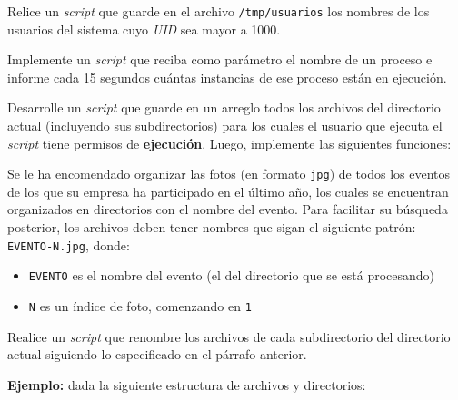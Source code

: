 \begin{questions}

\question Relice un \textit{script} que guarde en el archivo \texttt{/tmp/usuarios} los
  nombres de los usuarios del sistema cuyo \textit{UID} sea mayor a 1000.

\question Implemente un \textit{script} que reciba como parámetro el nombre de un
  proceso e informe cada 15 segundos cuántas instancias de ese proceso están en
  ejecución.

\question Desarrolle un \textit{script} que guarde en un arreglo todos los archivos del
  directorio actual (incluyendo sus subdirectorios) para los cuales el usuario que ejecuta
  el \textit{script} tiene permisos de \textbf{ejecución}. Luego, implemente las siguientes
  funciones:

\question Se le ha encomendado organizar las fotos (en formato \texttt{jpg}) de todos los eventos
  de los que su empresa ha participado en el último año, los cuales se encuentran organizados en
  directorios con el nombre del evento. Para facilitar su búsqueda posterior, los archivos deben
  tener nombres que sigan el siguiente patrón: \texttt{EVENTO-N.jpg}, donde:
  \begin{itemize}
    \item \texttt{EVENTO} es el nombre del evento (el del directorio que se está procesando)
    \item \texttt{N} es un índice de foto, comenzando en \texttt{1}
  \end{itemize}

  Realice un \textit{script} que renombre los archivos de cada subdirectorio del directorio actual
  siguiendo lo especificado en el párrafo anterior.

  \textbf{Ejemplo:} dada la siguiente estructura de archivos y directorios:

  \begin{lstlisting}


\end{lstlisting}
\end{questions}
